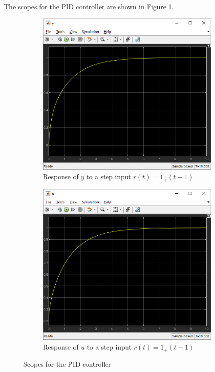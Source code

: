 \subsection{}
The scopes for the PID controller are shown in Figure \ref{fig:Q1PIDScopes}.
\begin{figure}[h]
    \centering
    \begin{subfigure}[b]{0.45\linewidth}
        \includegraphics[width=\linewidth]{Questions/Figures/Q1PIDy.png}
        \caption{Response of $y$ to a step input $r(t) = 1_{+}(t-1)$}
    \end{subfigure}
    \begin{subfigure}[b]{0.45\linewidth}
        \includegraphics[width=\linewidth]{Questions/Figures/Q1PIDu.png}
        \caption{Response of $u$ to a step input $r(t) = 1_{+}(t-1)$}
    \end{subfigure}
    \caption{Scopes for the PID controller}
    \label{fig:Q1PIDScopes}
\end{figure}

